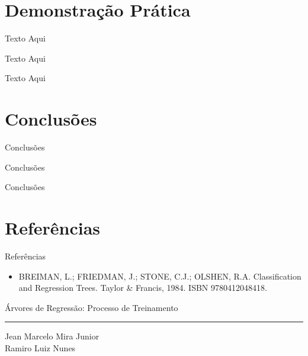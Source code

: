 \documentclass[handout,aspectratio = 169]{beamer}
\begin{document}

\section{Demonstração Prática}

\begin{frame}{Texto Aqui}
\end{frame}

\begin{frame}{Texto Aqui}
\end{frame}

\begin{frame}{Texto Aqui}
\end{frame}


\section{Conclusões}

\begin{frame}{Conclusões}
\end{frame}

\begin{frame}{Conclusões}
\end{frame}

\begin{frame}{Conclusões}
\end{frame}


\section{Referências}
\begin{frame}[t]{Referências}
    \begin{itemize}
        \item BREIMAN, L.; FRIEDMAN, J.; STONE, C.J.; OLSHEN, R.A. Classification and Regression Trees. Taylor \& Francis, 1984. ISBN 9780412048418.
    \end{itemize}
\end{frame}

\begin{frame}
    \centering
   Árvores de Regressão: Processo de Treinamento
   \par\noindent\rule{\textwidth}{0.5pt}
    Jean Marcelo Mira Junior\\
    Ramiro Luiz Nunes

\end{frame}
\end{document}
